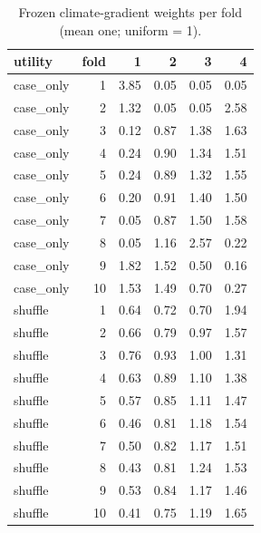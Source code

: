 \begin{table}[t]
\centering
\small
\caption{Frozen climate-gradient weights per fold (mean one; uniform = 1).}
\label{tab:weights-by-fold}
\begin{tabular}{lrrrrr}
\toprule
utility & fold & 1 & 2 & 3 & 4 \\
\midrule
case\_only & 1 & 3.85 & 0.05 & 0.05 & 0.05 \\
case\_only & 2 & 1.32 & 0.05 & 0.05 & 2.58 \\
case\_only & 3 & 0.12 & 0.87 & 1.38 & 1.63 \\
case\_only & 4 & 0.24 & 0.90 & 1.34 & 1.51 \\
case\_only & 5 & 0.24 & 0.89 & 1.32 & 1.55 \\
case\_only & 6 & 0.20 & 0.91 & 1.40 & 1.50 \\
case\_only & 7 & 0.05 & 0.87 & 1.50 & 1.58 \\
case\_only & 8 & 0.05 & 1.16 & 2.57 & 0.22 \\
case\_only & 9 & 1.82 & 1.52 & 0.50 & 0.16 \\
case\_only & 10 & 1.53 & 1.49 & 0.70 & 0.27 \\
shuffle & 1 & 0.64 & 0.72 & 0.70 & 1.94 \\
shuffle & 2 & 0.66 & 0.79 & 0.97 & 1.57 \\
shuffle & 3 & 0.76 & 0.93 & 1.00 & 1.31 \\
shuffle & 4 & 0.63 & 0.89 & 1.10 & 1.38 \\
shuffle & 5 & 0.57 & 0.85 & 1.11 & 1.47 \\
shuffle & 6 & 0.46 & 0.81 & 1.18 & 1.54 \\
shuffle & 7 & 0.50 & 0.82 & 1.17 & 1.51 \\
shuffle & 8 & 0.43 & 0.81 & 1.24 & 1.53 \\
shuffle & 9 & 0.53 & 0.84 & 1.17 & 1.46 \\
shuffle & 10 & 0.41 & 0.75 & 1.19 & 1.65 \\
\bottomrule
\end{tabular}
\end{table}
